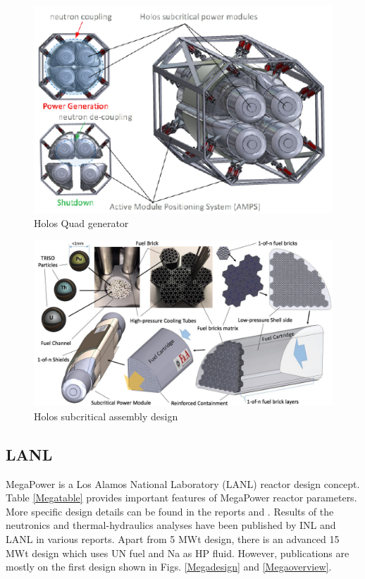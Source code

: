 \documentclass[10pt,a4paper]{article}
\begin{document}
\begin{figure}[hbtp]
\centering
\includegraphics[scale=1]{Figs/holosquad.jpeg}
\caption{Holos Quad generator}
\label{Holosquad}
\end{figure}

\begin{figure}[hbtp]
\centering
\includegraphics[scale=0.3]{Figs/holosfueldesign.jpeg}
\caption{Holos subcritical assembly design}
\label{Holosdesign}
\end{figure}

\subsection{LANL}
MegaPower is a Los Alamos National Laboratory (LANL) reactor design concept. Table \ref{Megatable} provides important features of MegaPower reactor parameters. More specific design details can be found in the reports \cite{mega17} and \cite{mega15}. Results of the neutronics and thermal-hydraulics analyses have been published by INL and LANL in various reports. Apart from 5 MWt design, there is an advanced 15 MWt design which uses UN fuel and Na as HP fluid. However, publications are mostly on the first design shown in Figs. \ref{Megadesign} and \ref{Megaoverview}. 
\end{document}
